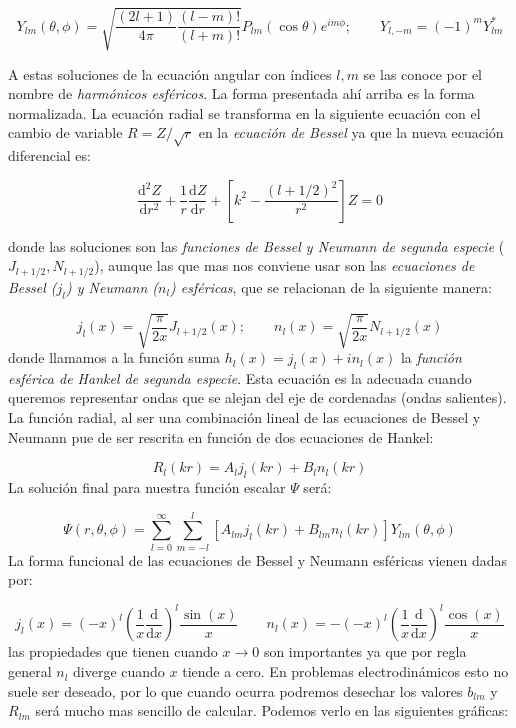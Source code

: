 \documentclass[12pt,a4paper]{article}
\newcommand{\parentesis}[1]{\left( #1  \right)}
\newcommand{\ccorchetes}[1]{\left[ #1  \right]}
\newcommand{\derivadas}[2]{\frac{\D #1}{\D #2}}
\newcommand{\D}{\mathrm{d}}
\numberwithin{equation}{section}
\numberwithin{figure}{section}
\begin{document}
\begin{equation}
Y_{lm} (\theta, \phi) = \sqrt{\dfrac{(2l+1)}{4 \pi} \dfrac{(l-m)!}{(l+m)!}} P_{lm} (\cos \theta)  e^{im \phi}; \quad \quad Y_{l,-m} = (-1)^m Y_{lm}^*
\end{equation}

A estas soluciones de la ecuación angular con índices $l,m$ se las conoce por el nombre de  \textit{harmónicos esféricos}. La forma presentada ahí arriba es la forma normalizada. La ecuación radial se transforma en la siguiente ecuación con el cambio de variable $R = Z/ \sqrt{r}$ en la \textit{ecuación de Bessel} ya que la nueva ecuación diferencial es:

\begin{equation}
\derivadas{^2 Z}{r^2} + \dfrac{1}{r} \derivadas{Z}{r} + \ccorchetes{k^2 - \dfrac{(l+1/2)^2}{r^2}} Z = 0
\end{equation}

donde las soluciones son las \textit{funciones de Bessel y Neumann de segunda especie} ($J_{l+1/2},N_{l+1/2} $), aunque las que mas nos conviene usar son las \textit{ecuaciones de Bessel ($j_l$) y Neumann ($n_l$) esféricas}, que se relacionan de la siguiente manera:

\begin{equation}
j_l (x) = \sqrt{\dfrac{\pi}{2 x}} J_{l+1/2} (x); \quad \quad
n_l (x) = \sqrt{\dfrac{\pi}{2 x}} N_{l+1/2} (x)
\end{equation}
donde llamamos a la función suma $h_l (x) = j_l (x) + i n_l(x)$ la \textit{función esférica de Hankel de segunda especie}. Esta ecuación es la adecuada cuando queremos representar ondas que se alejan del eje de cordenadas (ondas salientes). La función radial, al ser una combinación lineal de las ecuaciones de Bessel y Neumann pue de ser rescrita en función de dos ecuaciones de Hankel:

\begin{equation}
R_{l} (kr) = A_{l} j_l (kr) + B_l n_l (kr) 
\end{equation}
La solución final para nuestra función escalar $\Psi$ será:

\begin{equation}
\Psi (r, \theta, \phi) = \sum_{l=0}^{\infty} \sum_{m=-l}^l \ccorchetes{A_{lm} j_l (kr) + B_{lm} n_l (kr)} Y_{lm} (\theta, \phi)
\end{equation}
La forma funcional de las ecuaciones de Bessel y Neumann esféricas vienen dadas por:

\begin{equation}
j_l (x) = (-x)^l \parentesis{\dfrac{1}{x} \dfrac{\D}{\D x}}^l \dfrac{\sin(x)}{x} \quad \quad
n_l (x) = -(-x)^l \parentesis{\dfrac{1}{x} \dfrac{\D}{\D x}}^l \dfrac{\cos(x)}{x}
\end{equation}
las propiedades que tienen cuando $x \rightarrow 0$ son importantes ya que por regla general $n_l$ diverge cuando $x$ tiende a cero. En problemas electrodinámicos esto no suele ser deseado, por lo que cuando ocurra podremos desechar los valores $b_{lm}$ y $R_{lm}$ será mucho mas sencillo de calcular. Podemos verlo en las siguientes gráficas:
\end{document}
